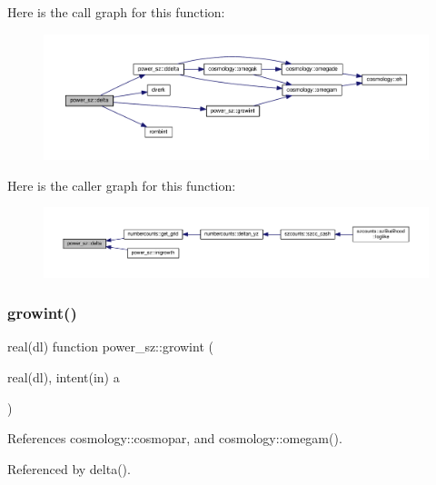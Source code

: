 Here is the call graph for this function\+:
\nopagebreak
\begin{figure}[H]
\begin{center}
\leavevmode
\includegraphics[width=350pt]{namespacepower__sz_aa30236046bbf63ea0304f440bef4964d_cgraph}
\end{center}
\end{figure}
Here is the caller graph for this function\+:
\nopagebreak
\begin{figure}[H]
\begin{center}
\leavevmode
\includegraphics[width=350pt]{namespacepower__sz_aa30236046bbf63ea0304f440bef4964d_icgraph}
\end{center}
\end{figure}
\mbox{\label{namespacepower__sz_ad0eb7df0cb325285d971ac5aa7c80754}} 
\subsubsection{\texorpdfstring{growint()}{growint()}}
{\footnotesize\ttfamily real(dl) function power\+\_\+sz\+::growint (\begin{DoxyParamCaption}\item[{real(dl), intent(in)}]{a }\end{DoxyParamCaption})}



References cosmology\+::cosmopar, and cosmology\+::omegam().



Referenced by delta().


